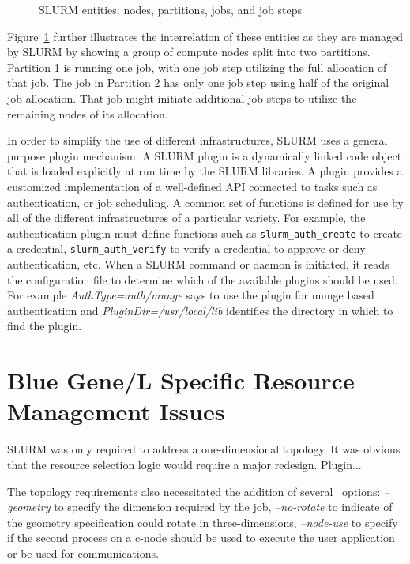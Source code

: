 \documentclass[10pt,onecolumn,times]{../common/llncs}
\begin{document}
{\begin{figure}[tcb]
\centerline{}
\caption{\small SLURM entities: nodes, partitions, jobs, and job steps}
\label{entities}
\end{figure}

Figure~\ref{entities} further illustrates the interrelation of these
entities as they are managed by SLURM by showing a group of
compute nodes split into two partitions. Partition 1 is running one job,
with one job step utilizing the full allocation of that job.  The job
in Partition 2 has only one job step using half of the original job
allocation.  That job might initiate additional job steps to utilize
the remaining nodes of its allocation.

In order to simplify the use of different infrastructures,
SLURM uses a general purpose plugin mechanism.  A SLURM plugin is a
dynamically linked code object that is loaded explicitly at run time
by the SLURM libraries.  A plugin provides a customized implementation
of a well-defined API connected to tasks such as authentication,
or job scheduling.  A common set of functions is defined
for use by all of the different infrastructures of a particular variety.
For example, the authentication plugin must define functions such as 
{\tt slurm\_auth\_create} to create a credential, {\tt slurm\_auth\_verify}
to verify a credential to approve or deny authentication, etc.  
When a SLURM command or daemon is initiated, it
reads the configuration file to determine which of the available plugins
should be used.  For example {\em AuthType=auth/munge} says to use the
plugin for munge based authentication and {\em PluginDir=/usr/local/lib}
identifies the directory in which to find the plugin.

\section {Blue Gene/L Specific Resource Management Issues}

SLURM was only required to address a one-dimensional topology.
It was obvious that the resource selection logic would require a major 
redesign. Plugin...

The topology requirements also necessitated the addition of several 
\srun\ options: {\em --geometry} to specify the dimension required by 
the job,
 {\em --no-rotate} to indicate of the geometry specification could rotate 
in three-dimensions,
{\em --node-use} to specify if the second process on a c-node should 
be used to execute the user application or be used for communications.

}
\end{document}
